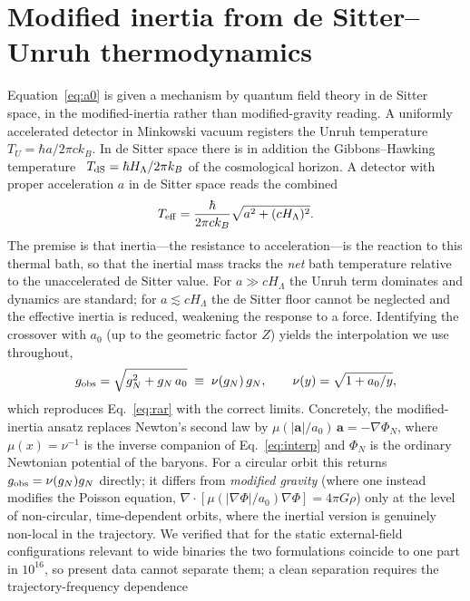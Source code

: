 \documentclass[aps,prd,twocolumn,10pt,nofootinbib,superscriptaddress]{revtex4-2}
\begin{document}
\section{Modified inertia from de Sitter--Unruh thermodynamics}
\label{sec:mechanism}
Equation~\eqref{eq:a0} is given a mechanism by quantum field theory in de Sitter space, in the modified-inertia
rather than modified-gravity reading. A uniformly accelerated detector in Minkowski vacuum registers the Unruh
temperature $T_U=\hbar a/2\pi c k_B$. In de Sitter space there is in addition the Gibbons--Hawking
temperature~\cite{GibbonsHawking} $T_{\rm dS}=\hbar H_\Lambda/2\pi k_B$ of the cosmological horizon. A detector with
proper acceleration $a$ in de Sitter space reads the combined~\cite{DeserLevin}
\begin{equation}
T_{\rm eff}=\frac{\hbar}{2\pi c k_B}\sqrt{a^2+(cH_\Lambda)^2}.
\label{eq:Teff}
\end{equation}
The premise is that inertia---the resistance to acceleration---is the reaction to this thermal bath, so that the
inertial mass tracks the \emph{net} bath temperature relative to the unaccelerated de Sitter value. For
$a\!\gg\!cH_\Lambda$ the Unruh term dominates and dynamics are standard; for $a\!\lesssim\!cH_\Lambda$ the de Sitter
floor cannot be neglected and the effective inertia is reduced, weakening the response to a force. Identifying the
crossover with $a_0$ (up to the geometric factor $Z$) yields the interpolation we use throughout,
\begin{equation}
g_{\rm obs}=\sqrt{g_N^2+g_N\,a_0}\;\equiv\;\nu(g_N)\,g_N,\qquad \nu(y)=\sqrt{1+a_0/y},
\label{eq:interp}
\end{equation}
which reproduces Eq.~\eqref{eq:rar} with the correct limits. Concretely, the modified-inertia ansatz replaces Newton's second law by
$\mu(|\mathbf{a}|/a_0)\,\mathbf{a}=-\nabla\Phi_N$, where $\mu(x)=\nu^{-1}$ is the inverse companion of
Eq.~\eqref{eq:interp} and $\Phi_N$ is the ordinary Newtonian potential of the baryons. For a circular orbit this
returns $g_{\rm obs}=\nu(g_N)g_N$ directly; it differs from \emph{modified gravity} (where one instead modifies the
Poisson equation, $\nabla\!\cdot[\mu(|\nabla\Phi|/a_0)\nabla\Phi]=4\pi G\rho$) only at the level of non-circular,
time-dependent orbits, where the inertial version is genuinely non-local in the trajectory. We verified that for the
static external-field configurations relevant to wide binaries the two formulations coincide to one part in
$10^{16}$, so present data cannot separate them; a clean separation requires the trajectory-frequency dependence
\end{document}
